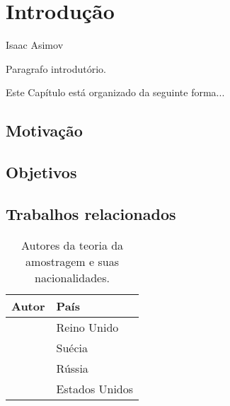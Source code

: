 
\chapter{Introdução}
\label{cap:1:introducao}

{Isaac Asimov}

Paragrafo introdutório.

Este Capítulo está organizado da seguinte forma...

\section{Motivação}
\label{sec:1:motivacao}

\citep{cormen2009algorithms}

\section{Objetivos}
\label{sec:1:objetivos}


\section{Trabalhos relacionados}
\label{sec:1:trabalhos}

\begin{table}[ht]
\centering
\begin{tabular}{ll}
\toprule
Autor                                   & País \\
\midrule
\citet{whittaker1915interpolation} & Reino Unido \\
\citet{nyquist1928telegraph}       & Suécia \\
\citet{kotelnikov1933capacity}     & Rússia \\
\citet{shannon1949communication}   & Estados Unidos \\
\bottomrule
\end{tabular}
\caption[Autores da teoria da amostragem]
    {Autores da teoria da amostragem e suas nacionalidades.}
\label{tab:autor-amostragem}
\end{table}


